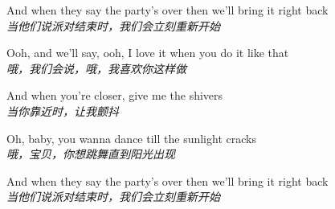 \begin{spacing}{1.5}
\begin{flushleft}
And when they say the party's over then we'll bring it right back\\
\textit{当他们说派对结束时，我们会立刻重新开始}\lyricspace

Ooh, and we'll say, ooh, I love it when you do it like that\\
\textit{哦，我们会说，哦，我喜欢你这样做}\lyricspace

And when you're closer, give me the shivers\\
\textit{当你靠近时，让我颤抖}\lyricspace

Oh, baby, you wanna dance till the sunlight cracks\\
\textit{哦，宝贝，你想跳舞直到阳光出现}\lyricspace

And when they say the party's over then we'll bring it right back\\
\textit{当他们说派对结束时，我们会立刻重新开始}\lyricspace
\end{flushleft}
\end{spacing}

